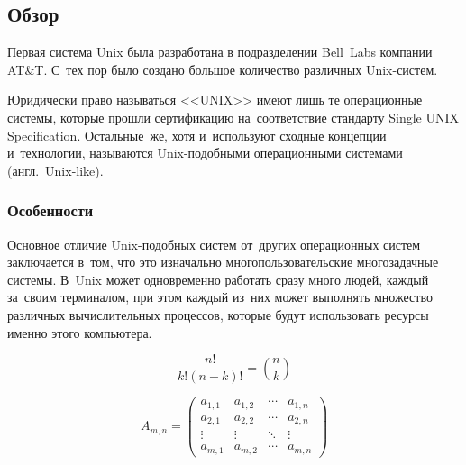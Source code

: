 \documentclass{bmstu}
\begin{document}
\subsection{Обзор}

Первая система Unix была разработана в подразделении Bell~Labs компании AT\&T. С~тех пор было создано большое количество различных Unix-систем.

Юридически право называться <<UNIX>> имеют лишь те операционные системы, которые прошли сертификацию на~соответствие стандарту Single UNIX Specification.
Остальные~же, хотя и~используют сходные концепции и~технологии, называются Unix-подобными операционными системами (англ.~Unix-like).

\subsubsection{Особенности}

Основное отличие Unix-подобных систем от~других операционных систем заключается в~том, что это изначально многопользовательские многозадачные системы.
В~Unix может одновременно работать сразу много людей, каждый за~своим терминалом, при этом каждый из~них может выполнять множество различных вычислительных процессов, которые будут использовать ресурсы именно этого компьютера. \newpage


\begin{equation}\label{equ:matrix}
	\frac{n!}{k!(n-k)!} = \binom{n}{k}
\end{equation}

\begin{equation*}
	A_{m,n} =
	\begin{pmatrix}
		a_{1,1} & a_{1,2} & \cdots & a_{1,n} \\
		a_{2,1} & a_{2,2} & \cdots & a_{2,n} \\
		\vdots  & \vdots  & \ddots & \vdots  \\
		a_{m,1} & a_{m,2} & \cdots & a_{m,n}
	\end{pmatrix}
\end{equation*}
\end{document}
